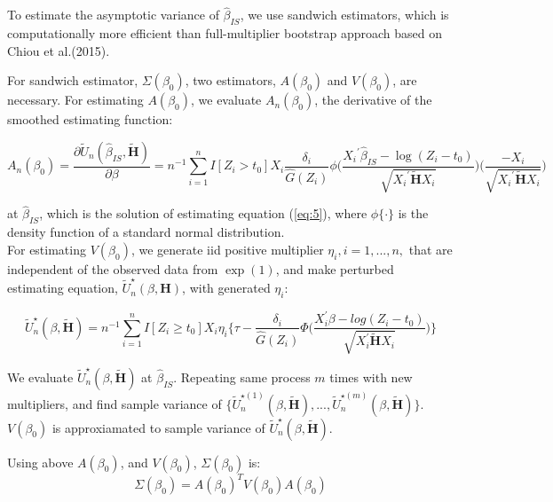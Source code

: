 \documentclass[12pt]{article}
\begin{document}
	\noindent To estimate the asymptotic variance of $\hat{\beta}_{IS}$, we use sandwich estimators, which is computationally more efficient than full-multiplier bootstrap approach based on Chiou et al.(2015). 
	
	\noindent For sandwich estimator, $\Sigma(\beta_0)$, two estimators, $A(\beta_0)$ and $V(\beta_0)$, are necessary. For estimating $A(\beta_0)$, 
	we evaluate $A_n(\beta_0)$, the derivative of the smoothed estimating function:
	
	\begin{equation}
	A_n(\beta_0) = \frac{\partial \tilde{U}_n(\hat{\beta}_{IS}, \tilde{\textbf{H}})}{\partial \beta} = n^{-1}\sum_{i=1}^{n} I[Z_i>t_0] X_i \frac{\delta_i}{\hat{G}(Z_i)} \phi\bigg(\frac{{X_i}^{\prime}\hat{\beta}_{IS}-\log(Z_i-t_0)}{\sqrt{{X_i}^{\prime}\tilde{\textbf{H}} X_i}}\bigg)\bigg(\frac{-{X_i}}{\sqrt{{X_i}^{\prime} \tilde{\textbf{H}} {X_i}}}\bigg)
	\end{equation}
	
	\noindent at $\hat{\beta}_{IS}$, which is the solution of estimating equation (\ref{eq:5}), where $\phi \{ \cdot \}$ is the density function of a standard normal distribution.\\
	
	\noindent For estimating $V(\beta_0)$, we generate iid positive multiplier $\eta_i, i=1,...,n,$ that are independent of the observed data from $\exp(1)$, and make perturbed estimating equation, $\tilde{U}^{\star}_n(\beta, \textbf{H})$, with generated $\eta_i$:
	
	\begin{equation} \label{eq:6}
	\tilde{U}^{\star}_n(\beta, \tilde{\textbf{H}}) = n^{-1} \sum_{i=1}^{n} I[Z_i \geq t_0] X_i \eta_i \Big\{\tau - \frac{\delta_i}{\hat{G}(Z_i)}\Phi\Big(\frac{X_i^\prime\beta-log(Z_i-t_0)}{\sqrt{X_i^{\prime} \tilde{\textbf{H}} X_{i}}}\Big)\Big\}
	\end{equation}
	
	\noindent We evaluate $\tilde{U}^{\star}_n(\beta, \tilde{\textbf{H}})$ at $\hat{\beta}_{IS}$. Repeating same process $m$ times with new multipliers, and find sample variance of $\{\tilde{U}^{\star (1)}_n(\beta, \tilde{\textbf{H}}),..., \tilde{U}^{\star (m)}_n(\beta, \tilde{\textbf{H}})\}$. $V(\beta_0)$ is approxiamated to sample variance of $\tilde{U}^{\star}_n(\beta, \tilde{\textbf{H}})$.
	
	\noindent Using above $A(\beta_0)$, and $V(\beta_0)$, $\Sigma(\beta_0)$ is:
	\begin{equation}
	\Sigma(\beta_0) = A(\beta_0)^T V(\beta_0) A(\beta_0)
	\end{equation}
	
\end{document}
